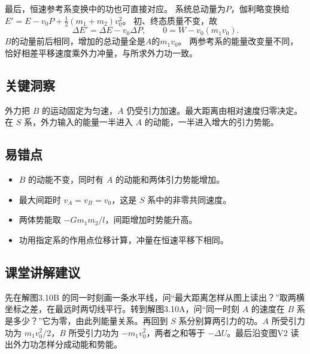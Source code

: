 \documentclass[UTF8,fontset=fandol,a4paper,11pt]{ctexart}
\begin{document}
最后，恒速参考系变换中的功也可直接对应。
系统总动量为$P$，伽利略变换给
$E'=E-v_0P+\frac12(m_1+m_2)v_0^2$。
初、终态质量不变，故
\[
\Delta E'=\Delta E-v_0\Delta P,
\qquad 0=W-v_0(m_1v_0).
\]
$B$的动量前后相同，增加的总动量全是$A$的$m_1v_0$。
两参考系的能量改变量不同，恰好相差平移速度乘外力冲量，与所求外力功一致。




\subsection*{关键洞察}

外力把 $B$ 的运动固定为匀速，$A$ 仍受引力加速。最大距离由相对速度归零决定。在 $S$ 系，外力输入的能量一半进入 $A$ 的动能，一半进入增大的引力势能。



\subsection*{易错点}

\begin{itemize}
\item $B$ 的动能不变，同时有 $A$ 的动能和两体引力势能增加。
\item 最大间距时 $v_A=v_B=v_0$，这是 $S$ 系中的非零共同速度。
\item 两体势能取 $-Gm_1m_2/l$，间距增加时势能升高。
\item 功用指定系的作用点位移计算，冲量在恒速平移下相同。
\end{itemize}



\subsection*{课堂讲解建议}

先在解图3.10B 的同一时刻画一条水平线，问“最大距离怎样从图上读出？”取两横坐标之差，在最远时两切线平行。转到解图3.10A，问“同一时刻 $A$ 的速度在 $B$ 系是多少？”它为零，由此列能量关系。再回到 $S$ 系分别算两引力的功。$A$ 所受引力功为 $m_1v_0^2/2$，$B$ 所受引力功为 $-m_1v_0^2$，两者之和等于 $-\Delta U$。最后沿变图V2 读出外力功怎样分成动能和势能。

\end{document}
